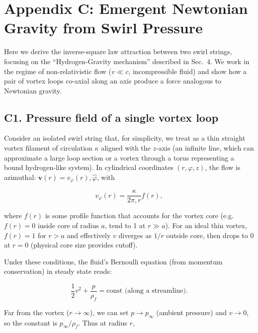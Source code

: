 \documentclass[10pt,reprint,aps,onecolumn,nofootinbib]{revtex4-2}
\newcommand{\rhoF}{\rho_{\!f}}     %
\begin{document}
\section*{Appendix C: Emergent Newtonian Gravity from Swirl Pressure}


Here we derive the inverse-square law attraction between two swirl strings, focusing on the “Hydrogen-Gravity mechanism” described in Sec.~4. We work in the regime of non-relativistic flow ($v \ll c$, incompressible fluid) and show how a pair of vortex loops co-axial along an axis produce a force analogous to Newtonian gravity.


\subsection*{C1. Pressure field of a single vortex loop}

Consider an isolated swirl string that, for simplicity, we treat as a thin straight vortex filament of circulation $\kappa$ aligned with the $z$-axis (an infinite line, which can approximate a large loop section or a vortex through a torus representing a bound hydrogen-like system). In cylindrical coordinates $(r,\varphi,z)$, the flow is azimuthal: $\mathbf{v}(r) = v_\varphi(r), \hat{\varphi}$, with

\begin{equation}
\label{eq:vat}
v_\varphi(r) = \frac{\kappa}{2\pi,r} f(r),
\end{equation}

where $f(r)$ is some profile function that accounts for the vortex core (e.g. $f(r)=0$ inside core of radius $a$, tend to 1 at $r \gg a$). For an ideal thin vortex, $f(r)=1$ for $r>a$ and effectively $v$ diverges as $1/r$ outside core, then drops to 0 at $r=0$ (physical core size provides cutoff).


Under these conditions, the fluid’s Bernoulli equation (from momentum conservation) in steady state reads:

\begin{equation}
\frac{1}{2} v^2 + \frac{p}{\rhoF} = \text{const (along a streamline)}.
\end{equation}

Far from the vortex ($r\to \infty$), we can set $p \to p_{\infty}$ (ambient pressure) and $v \to 0$, so the constant is $p_{\infty}/\rhoF$. Thus at radius $r$,
\end{document}
